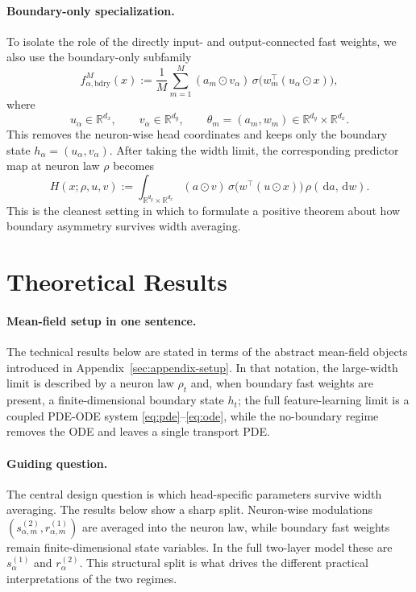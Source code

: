 \documentclass[11pt]{article}
\theoremstyle{definition}
\newcommand{\R}{\mathbb{R}}
\newcommand{\dd}{\,\mathrm{d}}
\begin{document}
\paragraph{Boundary-only specialization.}
To isolate the role of the directly input- and output-connected fast weights, we
also use the boundary-only subfamily
\begin{equation}
  f_{\alpha,\mathrm{bdry}}^M(x)
  :=
  \frac1M\sum_{m=1}^M
  (a_m\odot v_\alpha)\,
  \sigma\!\bigl(
    w_m^\top(u_\alpha\odot x)
  \bigr),
  \label{eq:model-bdry}
\end{equation}
where
\[
  u_\alpha\in\R^{d_x},
  \qquad
  v_\alpha\in\R^{d_y},
  \qquad
  \theta_m=(a_m,w_m)\in\R^{d_y}\times\R^{d_x}.
\]
This removes the neuron-wise head coordinates and keeps only the boundary state
$h_\alpha=(u_\alpha,v_\alpha)$. After taking the width limit, the corresponding
predictor map at neuron law $\rho$ becomes
\begin{equation}
  H(x;\rho,u,v)
  :=
  \int_{\R^{d_y}\times\R^{d_x}}
  (a\odot v)\,
  \sigma\!\bigl(w^\top(u\odot x)\bigr)\,\rho(\dd a,\dd w).
  \label{eq:H-bdry}
\end{equation}
This is the cleanest setting in which to formulate a positive theorem about how
boundary asymmetry survives width averaging.

\section{Theoretical Results}
\label{sec:results}

\paragraph{Mean-field setup in one sentence.}
The technical results below are stated in terms of the abstract mean-field
objects introduced in Appendix~\ref{sec:appendix-setup}. In that notation, the
large-width limit is described by a neuron law $\rho_t$ and, when boundary fast
weights are present, a finite-dimensional boundary state $h_t$; the full
feature-learning limit is a coupled PDE-ODE system \eqref{eq:pde}--\eqref{eq:ode},
while the no-boundary regime removes the ODE and leaves a single transport PDE.

\paragraph{Guiding question.}
The central design question is which head-specific parameters survive width
averaging. The results below show a sharp split. Neuron-wise modulations
$(s_{\alpha,m}^{(2)},r_{\alpha,m}^{(1)})$ are averaged into the neuron law, while
boundary fast weights remain finite-dimensional state variables. In the full
two-layer model these are $s_\alpha^{(1)}$ and $r_\alpha^{(2)}$. This
structural split is what drives the different practical interpretations of the
two regimes.
\end{document}
